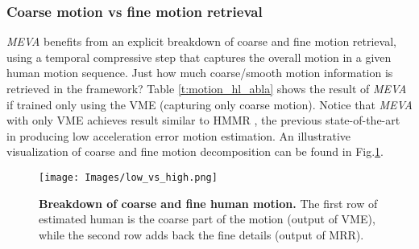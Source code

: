 \documentclass[runningheads]{llncs}
\begin{document}
\begin{table}[!thb]
\caption{\textbf{Ablation of Data augmentation for VAE.} Here we show the effects of data augmentation on the VAE. RR: random root rotation, FR: different sampling framerate, LR: left and right flip}
\label{t:vae_abla} 
\centering
{}
\end{table}


\subsubsection{Coarse motion vs fine motion retrieval}
\textit{MEVA} benefits from an explicit breakdown of coarse and fine motion retrieval, using a temporal compressive step that captures the overall motion in a given human motion sequence. Just how much coarse/smooth motion information is retrieved in the framework?
Table \ref{t:motion_hl_abla} shows the result of \textit{MEVA} if trained only using the VME (capturing only coarse motion). Notice that \textit{MEVA} with only VME achieves result similar to HMMR \cite{hmmr}, the previous state-of-the-art in producing low acceleration error motion estimation. An illustrative visualization of coarse and fine motion decomposition can be found in Fig.\ref{fig:highlow}.

\begin{figure}[ht]
    \centering
    \texttt{[image: Images/low\_vs\_high.png]}
    \caption{\textbf{Breakdown of coarse and fine human motion.} The first row of estimated human is the coarse part of the motion (output of VME), while the second row adds back the fine details (output of MRR).}
    \label{fig:highlow}
\end{figure}
\end{document}
